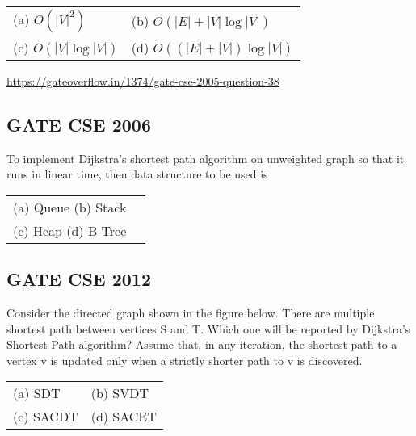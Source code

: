 \documentclass[a4paper,14pt]{extarticle}
\begin{document}
\subsubsection*{}
\begin{tabular}{ll}
(a) $O\left(|V|^2\right)$ \hspace{4cm} & (b) $O\left(|E|+|V|\log |V|\right)$ \\
(c) $O\left(|V|\log|V|\right)$ \hspace{4cm} & (d) $O\left(\left(|E|+|V|\right)\log|V|\right)$ \\
\end{tabular}
\vspace{0.5cm}

\url{https://gateoverflow.in/1374/gate-cse-2005-question-38}

\newpage
\subsection{GATE CSE 2006}
To implement Dijkstra's shortest path algorithm on unweighted graph so that it runs in linear time,
then data structure to be used is 

\begin{tabular}{ll}
    (a) Queue \hspace{5cm} (b) Stack\\
    (c) Heap \hspace{5cm}  (d) B-Tree\\
\end{tabular}

\subsection{GATE CSE 2012}
Consider the directed graph shown in the figure below. There are 
multiple shortest path between vertices S and T. Which one 
will be reported by Dijkstra's Shortest Path algorithm?
Assume that, in any iteration, the shortest path to a vertex v is 
updated only when a strictly shorter path to v is 
discovered.




\vspace{1cm}

\begin{tabular}{ll}
(a) SDT \hspace{4cm} & (b) SVDT \\
(c) SACDT \hspace{4cm} & (d) SACET \\
\end{tabular}
\end{document}
